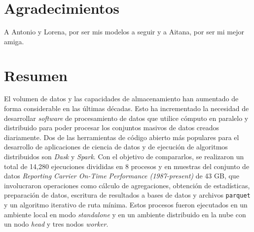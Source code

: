 \documentclass[11pt, oneside]{book}
\begin{document}

\chapter*{Agradecimientos}

\noindent A Antonio y Lorena, por ser mis modelos a seguir y a Aitana, por ser mi mejor amiga.



\chapter*{Resumen}

\noindent El volumen de datos y las capacidades de almacenamiento han aumentado de forma considerable en las últimas décadas. Esto ha incrementado la necesidad de desarrollar \textit{software} de procesamiento de datos que utilice cómputo en paralelo y distribuido para poder procesar los conjuntos masivos de datos creados diariamente. Dos de las herramientas de código abierto más populares para el desarrollo de aplicaciones de ciencia de datos y de ejecución de algoritmos distribuidos son \textit{Dask} y \textit{Spark}. Con el objetivo de compararlos, se realizaron un total de 14,280 ejecuciones divididas en 8 procesos y en muestras del conjunto de datos \textit{Reporting Carrier On-Time Performance (1987-present)} de 43 GB, que involucraron operaciones como cálculo de agregaciones, obtención de estadísticas, preparación de datos, escritura de resultados a bases de datos y archivos \texttt{parquet} y un algoritmo iterativo de ruta mínima. Estos procesos fueron ejecutados en un ambiente local en modo \textit{standalone} y en un ambiente distribuido en la nube con un nodo \textit{head} y tres nodos \textit{worker}.
\end{document}
